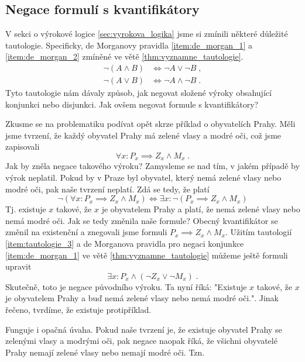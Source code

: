 \subsection{Negace formulí s kvantifikátory}
V sekci o výrokové logice \ref{sec:vyrokova_logika} jsme si zmínili některé důležité tautologie. Specificky, de Morganovy pravidla \ref{item:de_morgan_1} a \ref{item:de_morgan_2} zmíněné ve větě \ref{thm:vyznamne_tautologie}.
\begin{align*}
    \neg (A \land B) &\iff \neg A \lor \neg B\; ,\\
    \neg (A \lor B) &\iff \neg A \land \neg B\; .
\end{align*}
Tyto tautologie nám dávaly způsob, jak negovat složené výroky obsahující konjunkci nebo disjunkci. Jak ovšem negovat formule s kvantifikátory?\par
Zkusme se na problematiku podívat opět skrze příklad o obyvatelích Prahy. Měli jsme tvrzení, že každý obyvatel Prahy má zelené vlasy a modré oči, což jsme zapisovali
\begin{equation*}
    \forall x : P_x\implies Z_x \land M_x\; .
\end{equation*}
Jak by zněla negace takového výroku? Zamysleme se nad tím, v jakém případě by výrok neplatil. Pokud by v Praze byl obyvatel, který nemá zelené vlasy nebo modré oči, pak naše tvrzení neplatí. Zdá se tedy, že platí
\begin{equation*}
    \neg(\forall x : P_x\implies Z_x \land M_x) \iff \exists x : \neg (P_x\implies Z_x \land M_x)
\end{equation*}
Tj. existuje $x$ takové, že $x$ je obyvatelem Prahy a platí, že nemá zelené vlasy nebo nemá modré oči. Jak se tedy změnila naše formule? Obecný kvantifikátor se změnil na existenční a znegovali jsme formuli $P_x\implies Z_x \land M_x$. Užitím tautologií \ref{item:tautologie_3} a de Morganova pravidla pro negaci konjunkce \ref{item:de_morgan_1} ve větě \ref{thm:vyznamne_tautologie} můžeme ještě formuli upravit
\begin{equation*}
    \exists x : P_x\land (\neg Z_x \lor \neg M_x)\; .
\end{equation*}
Skutečně, toto je negace původního výroku. Ta nyní říká: "Existuje $x$ takové, že $x$ je obyvatelem Prahy a buď nemá zelené vlasy nebo nemá modré oči.". Jinak řečeno, tvrdíme, že existuje protipříklad.\par
Funguje i opačná úvaha. Pokud naše tvrzení je, že existuje obyvatel Prahy se zelenými vlasy a modrými oči, pak negace naopak říká, že všichni obyvatelé Prahy nemají zelené vlasy nebo nemají modré oči. Tzn.
